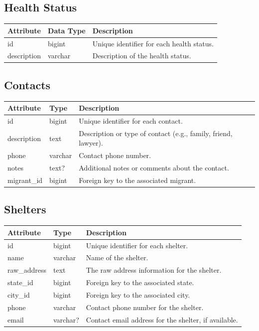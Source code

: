 \documentclass{scrreprt}
\begin{document}
\subsection*{Health Status}
\begin{tabular}{|m{2.5cm}|m{2.5cm}|m{6cm}|}
\hline
\textbf{Attribute} & \textbf{Data Type} & \textbf{Description} \\
\hline
id & bigint & Unique identifier for each health status. \\
\hline
description & varchar & Description of the health status. \\
\hline
\end{tabular}

\subsection*{Contacts}
\begin{tabular}{|m{2.5cm}|m{2.5cm}|m{6cm}|}
\hline
\textbf{Attribute} & \textbf{Type} & \textbf{Description} \\
\hline
id & bigint & Unique identifier for each contact. \\
\hline
description & text & Description or type of contact (e.g., family, friend, lawyer). \\
\hline
phone & varchar & Contact phone number. \\
\hline
notes & text? & Additional notes or comments about the contact. \\
\hline
migrant\_id & bigint & Foreign key to the associated migrant. \\
\hline
\end{tabular}

\subsection*{Shelters}
\begin{tabular}{|m{2.5cm}|m{2.5cm}|m{6cm}|}
\hline
\textbf{Attribute} & \textbf{Type} & \textbf{Description} \\
\hline
id & bigint & Unique identifier for each shelter. \\
\hline
name & varchar & Name of the shelter. \\
\hline
raw\_address & text & The raw address information for the shelter. \\
\hline
state\_id & bigint & Foreign key to the associated state. \\
\hline
city\_id & bigint & Foreign key to the associated city. \\
\hline
phone & varchar & Contact phone number for the shelter. \\
\hline
email & varchar? & Contact email address for the shelter, if available. \\
\hline
\end{tabular}
\end{document}
